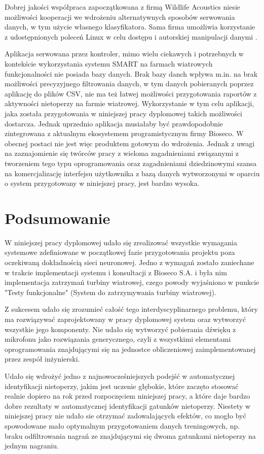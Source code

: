 \documentclass{sprz}
\begin{document}
Dobrej jakości współpraca zapoczątkowana z firmą Wildlife Acoustics niesie możliwości kooperacji we wdrożeniu alternatywnych sposobów serwowania danych, w tym użycie własnego klasyfikatora. Sama firma umożliwia korzystanie z udostępnionych poleceń Linux w celu dostępu i autorskiej manipulacji danymi \cite{smart-linux-guide}.

Aplikacja serwowana przez kontroler, mimo wielu ciekawych i potrzebnych w kontekście wykorzystania systemu SMART na farmach wiatrowych funkcjonalności nie posiada bazy danych. Brak bazy danch wpływa m.in. na brak możliwości precyzyjnego filtrowania danych, w tym danych pobieranych poprzez aplikację do plików CSV, nie ma też łatwej możliwości przygotowania raportów z aktywności nietoperzy na farmie wiatrowej. Wykorzystanie w tym celu aplikacji, jaka została przygotowania w niniejszej pracy dyplomowej takich możliwości dostarcza. Jednak uprzednio aplikacja musiałaby być prawdopodobnie zintegrowana z aktualnym ekosystemem programistycznym firmy Bioseco. W obecnej postaci nie jest więc produktem gotowym do wdrożenia. Jednak z uwagi na zaznajomienie się twórców pracy z wieloma zagadnieniami związanymi z tworzeniem tego typu oprogramowania oraz zagadnieniami dziedzinowymi szansa na komercjalizację interfejsu użytkownika z bazą danych wytworzonymi w oparciu o system przygotowany w niniejszej pracy, jest bardzo wysoka. 

\chapter{Podsumowanie}
W niniejszej pracy dyplomowej udało się zrealizować wszystkie wymagania systemowe zdefiniowane w początkowej fazie przygotowania projektu poza oczekiwaną dokładnością sieci neuronowej. Jedno z wymagań zostało zaniechane w trakcie implementacji systemu i konsultacji z Bioseco S.A. i była nim implementacja zatrzymań turbiny wiatrowej, czego powody wyjaśniono w punkcie "Testy funkcjonalne" (System do zatrzymywania turbiny wiatrowej). 


Z sukcesem udało się zrozumieć całość tego interdyscyplinarnego problemu, który ma rozwiązywać zaprojektowany w pracy dyplomowej system oraz wytworzyć wszystkie jego komponenty. Nie udało się wytworzyć pobierania dźwięku z mikrofonu jako rozwiązania generycznego, czyli z wszystkimi elementami oprogramowania znajdującymi się na jednostce obliczeniowej zaimplementowanej przez zespół inżynierski. 


Udało się wdrożyć jedno z najnowocześniejszych podejść w automatycznej identyfikacji nietoperzy, jakim jest uczenie głębokie, które zaczęto stosować realnie dopiero na rok przed rozpoczęciem niniejszej pracy, a które daje bardzo dobre rezultaty w automatycznej identyfikacji gatunków nietoperzy. Niestety w niniejszej pracy nie udało sie otrzymać zadowalających efektów, co mogło być spowodowane mało optymalnym przygotowaniem danych treningowych, np. braku odfiltrowania nagrań ze znajdującymi się dwoma gatunkami nietoperzy na jednym nagraniu.
\end{document}
